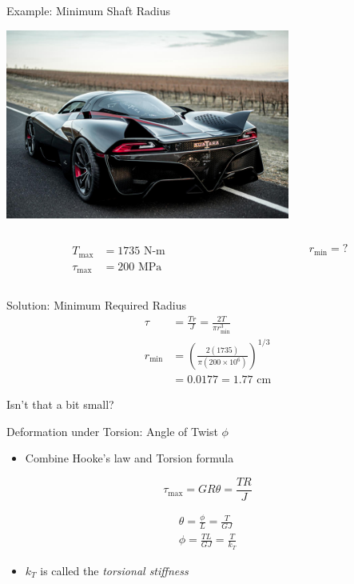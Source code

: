 \documentclass[10pt, svgnames]{beamer}
\begin{document}
\begin{frame}[label={sec:orgebbbb0f}]{Example: Minimum Shaft Radius}
\begin{center}
\includegraphics[width=0.7\textwidth]{./pictures/ssc-tuatara.jpg}
\end{center}

\begin{columns}
\begin{column}{0.5\columnwidth}
\begin{align*}
  T_{\max} &= 1735 \text{ N-m} \\
  \tau_{\max} &= 200 \text{ MPa}
\end{align*}
\end{column}

\begin{column}{0.5\columnwidth}
\[r_{\min} = ?\]
\end{column}
\end{columns}
\end{frame}

\begin{frame}[label={sec:orgad6c313}]{Solution: Minimum Required Radius}
\begin{align*}
  \tau &= \frac{Tr}{J} = \frac{2T}{\pi r_{\min}^{3}} \\
  r_{\min} &= \left( \frac{2(1735)}{\pi (200 \times 10^{6})} \right)^{1/3} \\
       &= 0.0177 = 1.77 \text{ cm}
\end{align*}

Isn't that a bit small?
\end{frame}

\begin{frame}[label={sec:org5f1a853}]{Deformation under Torsion: Angle of Twist \(\phi\)}
\begin{itemize}
\item Combine Hooke's law and Torsion formula
\end{itemize}

\[\tau_{\max} = GR\theta = \frac{TR}{J}\]

\begin{gather*}
  \theta = \frac{\phi}{L} = \frac{T}{GJ} \\
  \phi = \frac{TL}{GJ} = \frac{T}{k_T}
\end{gather*}

\begin{itemize}
\item \(k_T\) is called the \emph{torsional stiffness}
\end{itemize}
\end{frame}
\end{document}
